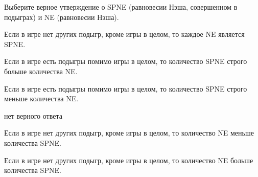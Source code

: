 
\begin{question}
Выберите верное утверждение о SPNE (равновесии Нэша, совершенном в подыграх) и NE (равновесии Нэша).
\begin{answerlist}
  \item Если в игре нет других подыгр, кроме игры в целом, то каждое NE является SPNE.
  \item Если в игре есть подыгры помимо игры в целом, то количество SPNE строго больше количества NE.
  \item Если в игре есть подыгры помимо игры в целом, то количество SPNE строго меньше количества NE.
  \item нет верного ответа
  \item Если в игре нет других подыгр, кроме игры в целом, то количество NE меньше количества SPNE.
  \item Если в игре нет других подыгр, кроме игры в целом, то количество NE больше количества SPNE.
\end{answerlist}
\end{question}


